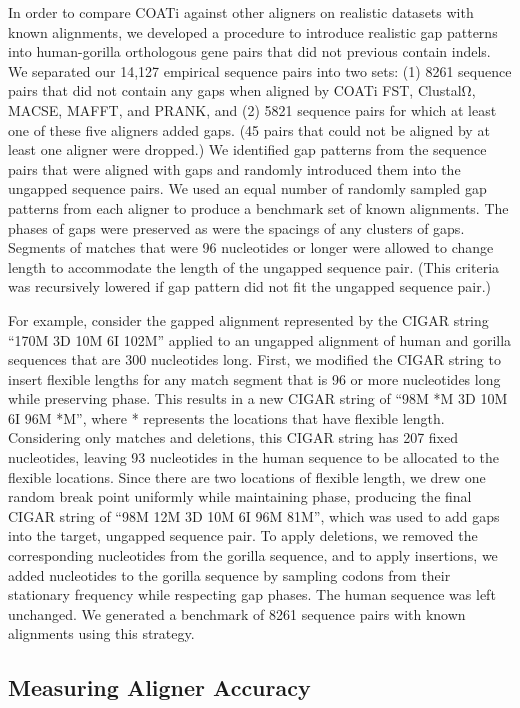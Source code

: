 \documentclass[12pt,letterpaper]{article}
\begin{document}
In order to compare COATi against other aligners on realistic datasets with known alignments, we developed a procedure to introduce realistic gap patterns into human-gorilla orthologous gene pairs that did not previous contain indels. We separated our 14,127 empirical sequence pairs into two sets: %
(1) 8261 sequence pairs that did not contain any gaps when aligned by COATi FST, ClustalΩ, MACSE, MAFFT, and PRANK, and (2) 5821 sequence pairs for which at least one of these five aligners added gaps.
(45 pairs that could not be aligned by at least one aligner were dropped.) We identified gap patterns from the sequence pairs that were aligned with gaps and randomly introduced them into the ungapped sequence pairs. We used an equal number of randomly sampled gap patterns from each aligner to produce a benchmark set of known alignments. The phases of gaps were preserved as were the spacings of any clusters of gaps. Segments of matches that were 96 nucleotides or longer were allowed to change length to accommodate the length of the ungapped sequence pair. (This criteria was recursively lowered if gap pattern did not fit the ungapped sequence pair.)

For example, consider the gapped alignment represented by the CIGAR string
%
``170M 3D 10M 6I 102M'' %
%
applied to an ungapped alignment of human and gorilla sequences that are 300 nucleotides long. First, we modified the CIGAR string to insert flexible lengths for any match segment that is 96 or more nucleotides long while preserving phase. This results in a new CIGAR string of
%
``98M *M 3D 10M 6I 96M *M'',
%
where * represents the locations that have flexible length. Considering only matches and deletions, this CIGAR string has 207 fixed nucleotides, leaving 93 nucleotides in the human sequence to be allocated to the flexible locations. Since there are two locations of flexible length, we drew one random break point uniformly while maintaining phase, producing the final CIGAR string of
%
``98M 12M 3D 10M 6I 96M 81M'',
%
which was used to add gaps into the target, ungapped sequence pair.
To apply deletions, we removed the corresponding nucleotides from the gorilla sequence, and to apply insertions, we added nucleotides to the gorilla sequence by sampling codons from their stationary frequency while respecting gap phases. The human sequence was left unchanged.
%
We generated a benchmark of 8261 sequence pairs with known alignments using this strategy.

\subsection*{Measuring Aligner Accuracy}
\end{document}
